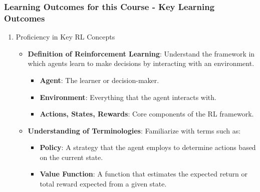 \documentclass[aspectratio=169]{beamer}
\begin{document}
\begin{frame}[fragile]
    \frametitle{Learning Outcomes for this Course - Key Learning Outcomes}
    \begin{enumerate}
        \item Proficiency in Key RL Concepts
        \begin{itemize}
            \item \textbf{Definition of Reinforcement Learning}: Understand the framework in which agents learn to make decisions by interacting with an environment.
                \begin{itemize}
                    \item \textbf{Agent}: The learner or decision-maker.
                    \item \textbf{Environment}: Everything that the agent interacts with.
                    \item \textbf{Actions, States, Rewards}: Core components of the RL framework.
                \end{itemize}
            \item \textbf{Understanding of Terminologies}: Familiarize with terms such as:
                \begin{itemize}
                    \item \textbf{Policy}: A strategy that the agent employs to determine actions based on the current state.
                    \item \textbf{Value Function}: A function that estimates the expected return or total reward expected from a given state.
                \end{itemize}
        \end{itemize}
    \end{enumerate}
\end{frame}
\end{document}
